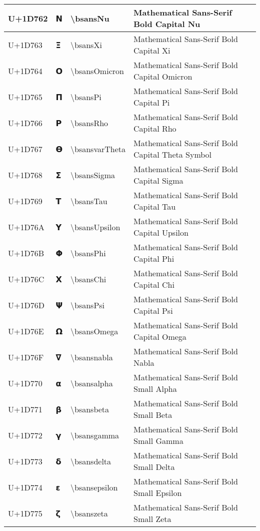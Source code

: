 \begin{table}[h]
\begin{tabulary}{\linewidth}{|L|L|L|L|}
\hline
U+1D762 & 𝝢 & {\textbackslash}bsansNu & Mathematical Sans-Serif Bold Capital Nu \\
\hline
U+1D763 & 𝝣 & {\textbackslash}bsansXi & Mathematical Sans-Serif Bold Capital Xi \\
\hline
U+1D764 & 𝝤 & {\textbackslash}bsansOmicron & Mathematical Sans-Serif Bold Capital Omicron \\
\hline
U+1D765 & 𝝥 & {\textbackslash}bsansPi & Mathematical Sans-Serif Bold Capital Pi \\
\hline
U+1D766 & 𝝦 & {\textbackslash}bsansRho & Mathematical Sans-Serif Bold Capital Rho \\
\hline
U+1D767 & 𝝧 & {\textbackslash}bsansvarTheta & Mathematical Sans-Serif Bold Capital Theta Symbol \\
\hline
U+1D768 & 𝝨 & {\textbackslash}bsansSigma & Mathematical Sans-Serif Bold Capital Sigma \\
\hline
U+1D769 & 𝝩 & {\textbackslash}bsansTau & Mathematical Sans-Serif Bold Capital Tau \\
\hline
U+1D76A & 𝝪 & {\textbackslash}bsansUpsilon & Mathematical Sans-Serif Bold Capital Upsilon \\
\hline
U+1D76B & 𝝫 & {\textbackslash}bsansPhi & Mathematical Sans-Serif Bold Capital Phi \\
\hline
U+1D76C & 𝝬 & {\textbackslash}bsansChi & Mathematical Sans-Serif Bold Capital Chi \\
\hline
U+1D76D & 𝝭 & {\textbackslash}bsansPsi & Mathematical Sans-Serif Bold Capital Psi \\
\hline
U+1D76E & 𝝮 & {\textbackslash}bsansOmega & Mathematical Sans-Serif Bold Capital Omega \\
\hline
U+1D76F & 𝝯 & {\textbackslash}bsansnabla & Mathematical Sans-Serif Bold Nabla \\
\hline
U+1D770 & 𝝰 & {\textbackslash}bsansalpha & Mathematical Sans-Serif Bold Small Alpha \\
\hline
U+1D771 & 𝝱 & {\textbackslash}bsansbeta & Mathematical Sans-Serif Bold Small Beta \\
\hline
U+1D772 & 𝝲 & {\textbackslash}bsansgamma & Mathematical Sans-Serif Bold Small Gamma \\
\hline
U+1D773 & 𝝳 & {\textbackslash}bsansdelta & Mathematical Sans-Serif Bold Small Delta \\
\hline
U+1D774 & 𝝴 & {\textbackslash}bsansepsilon & Mathematical Sans-Serif Bold Small Epsilon \\
\hline
U+1D775 & 𝝵 & {\textbackslash}bsanszeta & Mathematical Sans-Serif Bold Small Zeta \\

\end{tabulary}
\end{table}
